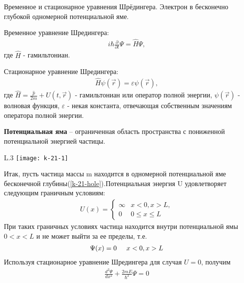 \documentclass[__main__.tex]{subfiles}
\begin{document}
Временное и стационарное уравнения Шрёдингера. Электрон в бесконечно глубокой одномерной потенциальной яме.\\ 
\begin{definition}
	Временное уравнение Шредингера:
	\begin{gather}
	\label{shred-time}
	i\hbar\frac{\partial{}}{\partial{t}}\Psi = \hat{H}\Psi,
	\end{gather}
	где $\hat{H}$ - гамильтониан.
\end{definition}
\begin{definition}
	Стационарное уравнение Шредингера: 
	\begin{gather}
	\label{shred-stac}
	\hat{H}\psi(\vec{r})=\varepsilon\psi(\vec{r}), 
	\end{gather}
	где $\hat{H}=\frac{\hat{p}}{2m}+U(t,\vec{r})$ - гамильтониан или оператор полной энергии, $\psi(\vec{r})$ - волновая функция, $\varepsilon$ - некая константа,  отвечающая собственным значениям оператора полной энергии.
\end{definition}
\begin{definition}
	\label{hole}
	\textbf{Потенциальная яма} – ограниченная область пространства с пониженной потенциальной энергией частицы. 
\end{definition}
\begin{wrapfigure}{L}{.3\linewidth}
\label{k-21-hole}
\texttt{[image: k-21-1]}
\caption{Бесконечная прямоугольная потенциальная яма}
\end{wrapfigure}
 Итак, пусть частица массы m находится в одномерной потенциальной яме бесконечной глубины(\ref{k-21-hole}).Потенциальная энергия U удовлетворяет следующим граничным условиям:
 \begin{gather}
 \label{k-21-boundary}
U(x)=\begin{cases}
\infty & x<0,x>L,\\
0 & 0\leq x \leq L
\end{cases}
\end{gather}
При таких граничных условиях частица находится внутри потенциальной ямы $0 < x < L$ и не может выйти за ее пределы, т.е.
\begin{gather}
\label{k-21-psi}
\Psi(x)=0\hspace{0.5cm}x<0,x>L
\end{gather}
Используя стационарное уравнение Шредингера для случая $U=0$, получим
\begin{gather}
\label{k-21-shredforzero}
\frac{d^2\Psi}{dx^2}+\frac{2mE}{\hbar^2}\Psi=0
\end{gather}
\end{document}
